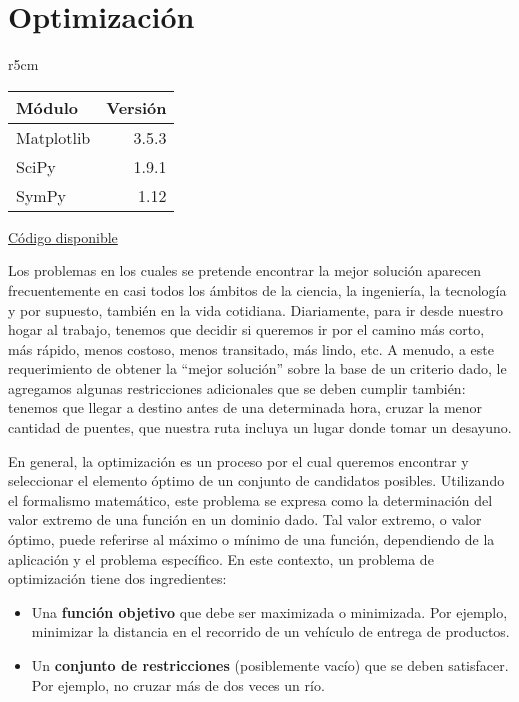 

\chapter{Optimización} \label{ch:optimizacion}   

\begin{wraptable}{r}{5cm}
\begin{modulesinfo}
\begin{center}
{\small
    \begin{tabular}{l r}
        \toprule
        \textbf{Módulo} & \textbf{Versión} \\
        \midrule
        Matplotlib & 3.5.3 \\
        SciPy & 1.9.1 \\
        SymPy & 1.12 \\
        \bottomrule
    \end{tabular}
    \vspace{0.75em}
    
    \href{https://github.com/facundobatista/libro-pyciencia/tree/master/código/optimizacion/}{Código disponible}
}
\end{center}
\end{modulesinfo}
\end{wraptable}

Los problemas en los cuales se pretende encontrar la mejor solución aparecen frecuentemente en casi todos los ámbitos de la ciencia, la ingeniería, la tecnología y por supuesto, también en la vida cotidiana. Diariamente, para ir desde nuestro hogar al trabajo, tenemos que decidir si queremos ir por el camino más corto, más rápido, menos costoso, menos transitado, más lindo, etc. A menudo, a este requerimiento de obtener la ``mejor solución'' sobre la base de un criterio dado, le agregamos algunas restricciones adicionales que se deben cumplir también: tenemos que llegar a destino antes de una determinada hora, cruzar la menor cantidad de puentes, que nuestra ruta incluya un lugar donde tomar un desayuno. 

En general, la optimización es un proceso por el cual queremos encontrar y seleccionar el elemento óptimo de un conjunto de candidatos posibles. Utilizando el formalismo matemático, este problema se expresa como la determinación del valor extremo de una función en un dominio dado. Tal valor extremo, o valor óptimo, puede referirse al máximo o mínimo de una función, dependiendo de la aplicación y el problema específico. En este contexto, un problema de optimización tiene dos ingredientes:
\begin{itemize}
 \item Una \textbf{función objetivo} que debe ser maximizada o minimizada. Por ejemplo, minimizar la distancia en el recorrido de un vehículo de entrega de productos.
 \item Un \textbf{conjunto de restricciones} (posiblemente vacío) que se deben satisfacer. Por ejemplo, no cruzar más de dos veces un río.
\end{itemize}

